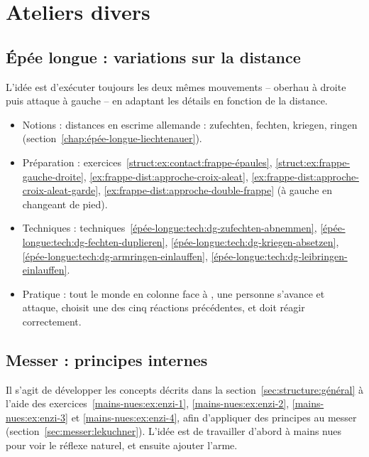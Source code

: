 \section{Ateliers divers}


\subsection{Épée longue : variations sur la distance}
\label{app:ateliers:épée-longue-variations-distance}


L'idée est d'exécuter toujours les deux mêmes mouvements – oberhau à droite puis attaque à gauche – en adaptant les détails en fonction de la distance.

\begin{itemize}
	\item Notions : distances en escrime allemande : zufechten, fechten, kriegen, ringen (section~\ref{chap:épée-longue-liechtenauer}).
	\item Préparation : exercices~\ref{struct:ex:contact:frappe-épaules}, \ref{struct:ex:frappe-gauche-droite}, \ref{ex:frappe-dist:approche-croix-aleat}, \ref{ex:frappe-dist:approche-croix-aleat-garde}, \ref{ex:frappe-dist:approche-double-frappe} (à gauche en changeant de pied).
	\item Techniques : techniques~\ref{épée-longue:tech:dg-zufechten-abnemmen}, \ref{épée-longue:tech:dg-fechten-duplieren}, \ref{épée-longue:tech:dg-kriegen-absetzen}, \ref{épée-longue:tech:dg-armringen-einlauffen}, \ref{épée-longue:tech:dg-leibringen-einlauffen}.
	\item Pratique : tout le monde en colonne face à \D, une personne \A s'avance et attaque, \D choisit une des cinq réactions précédentes, et \A doit réagir correctement.
\end{itemize}


\subsection{Messer : principes internes}



Il s'agit de développer les concepts décrits dans la section~\ref{sec:structure:général} à l'aide des exercices~\ref{mains-nues:ex:enzi-1}, \ref{mains-nues:ex:enzi-2}, \ref{mains-nues:ex:enzi-3} et \ref{mains-nues:ex:enzi-4}, afin d'appliquer des principes au messer (section~\ref{sec:messer:lekuchner}).
L'idée est de travailler d'abord à mains nues pour voir le réflexe naturel, et ensuite ajouter l'arme.

